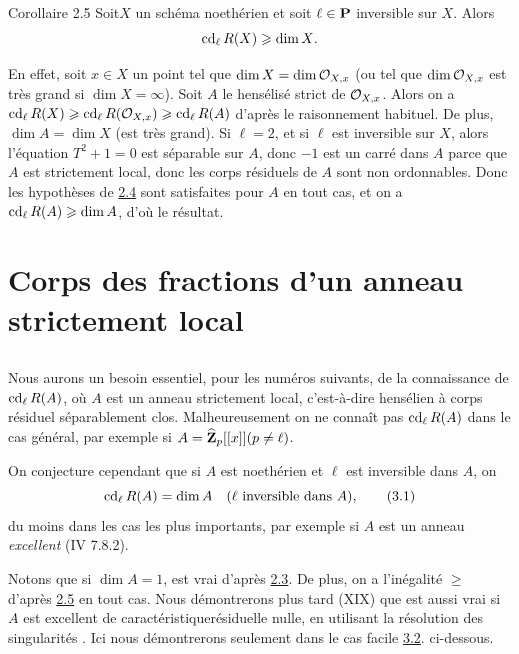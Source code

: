 \documentclass[10pt]{../fichiers-configuration-latex/smfart}
\begin{document}
\begin{enonce*}{Corollaire 2.5}
Soit\pageoriginale $X$ un schéma noethérien et soit $\ell\in
\mathbf{P}$ inversible sur $X$. Alors
$$
\operatorname{cd}_{\ell}R(X)\geqslant \dim X{}.
$$
\end{enonce*}

En effet, soit $x\in X$ un point tel que $\dim X=\dim {\mathcal O}_{X,x}$ (ou
tel que $\dim {\mathcal O}_{X,x}$ est très grand si $\dim X=\infty$). Soit $A$ le
hensélisé strict de ${\mathcal O}_{X,x}$. Alors on a $\operatorname{cd}_{\ell}R(X)\geqslant
\operatorname{cd}_{\ell}R({\mathcal O}_{X,x})\geqslant \operatorname{cd}_{\ell}R(A)$ d'après le raisonnement
habituel. De plus, $\dim A=\dim X$ (\resp est très grand). Si
$\ell=2$, et si $\ell$ est inversible sur $X$, alors l'équation
$T^2+1=0$ est séparable sur $A$, donc $-1$ est un carré dans $A$ parce
que $A$ est strictement local, donc les corps résiduels de $A$ sont
non ordonnables. Donc les hypothèses de \hyperref[X.cor2.4]{2.4} sont satisfaites pour $A$
en tout cas, et on a $\operatorname{cd}_{\ell}R(A)\geqslant \dim A$, d'où le résultat.

\section{Corps des fractions d'un anneau strictement local}

\setcounter{subsection}{-1}
\subsection{}
Nous aurons un besoin essentiel, pour les numéros suivants, de la
connaissance de $\operatorname{cd}_{\ell}R(A)$, où $A$ est un anneau strictement
local, c'est-à-dire hensélien à corps résiduel séparablement
clos. Malheureusement on ne connaît pas $\operatorname{cd}_{\ell}R(A)$ dans le cas
général, par exemple si
$A=\widehat{\mathbf{Z}}_p[[x]](p\neq \ell)$.

On conjecture cependant que si $A$ est noethérien et $\ell$ est
inversible dans $A$, on 
\begin{equation*}
\operatorname{cd}_{\ell}R(A)=\dim A\quad (\ell\mbox{ inversible dans } A){},\tag{3.1}
\end{equation*}
du moins dans les cas les plus importants, par exemple si $A$ est un
anneau \emph{excellent} (\EGA IV 7.8.2).

Notons que si $\dim A=1$,  est vrai d'après \hyperref[X.thm2.3]{2.3}. De plus, on a
l'inégalité $\geq$ d'après \hyperref[X.cor2.5]{2.5} en tout cas. Nous démontrerons plus
tard (XIX) que  est aussi vrai si $A$ est excellent de
caractéristique\pageoriginale résiduelle nulle, en utilisant la
résolution des singularités \cite{SGA4-10:3}. Ici nous démontrerons  seulement
dans le cas facile \hyperref[X.prop3.2]{3.2}. ci-dessous.
\end{document}
